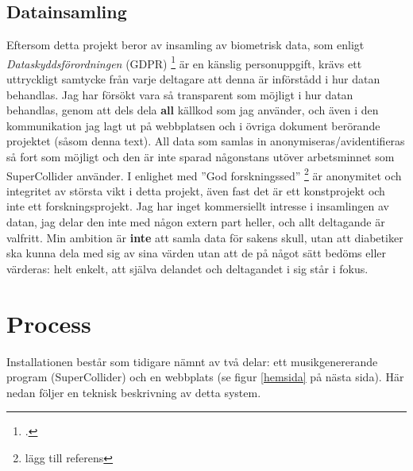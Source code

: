 \documentclass[11pt, a4paper]{article} %
\begin{document}
\subsection*{Datainsamling}
Eftersom detta projekt beror av insamling av biometrisk data, som enligt \emph{Dataskyddsförordningen} (GDPR) \footcite{integritetsskyddsmyndigheten_kansliga_nodate} är en känslig personuppgift, krävs ett uttryckligt samtycke från varje deltagare att denna är införstådd i hur datan behandlas. Jag har försökt vara så transparent som möjligt i hur datan behandlas, genom att dels dela \textbf{all} källkod som jag använder, och även i den kommunikation jag lagt ut på webbplatsen och i övriga dokument berörande projektet (såsom denna text). All data som samlas in anonymiseras/avidentifieras så fort som möjligt och den är inte sparad någonstans utöver arbetsminnet som SuperCollider använder. I enlighet med ''God forskningssed'' \footnote{lägg till referens} är anonymitet och integritet av största vikt i detta projekt, även fast det är ett konstprojekt och inte ett forskningsprojekt. Jag har inget kommersiellt intresse i insamlingen av datan, jag delar den inte med någon extern part heller, och allt deltagande är valfritt. Min ambition är \textbf{inte} att samla data för sakens skull, utan att diabetiker ska kunna dela med sig av sina värden utan att de på något sätt bedöms eller värderas: helt enkelt, att själva delandet och deltagandet i sig står i fokus. 

\section*{Process}
Installationen består som tidigare nämnt av två delar: ett musikgenererande program (SuperCollider) och en webbplats (se figur \ref{hemsida} på nästa sida). Här nedan följer en teknisk beskrivning av detta system.

\end{document}
